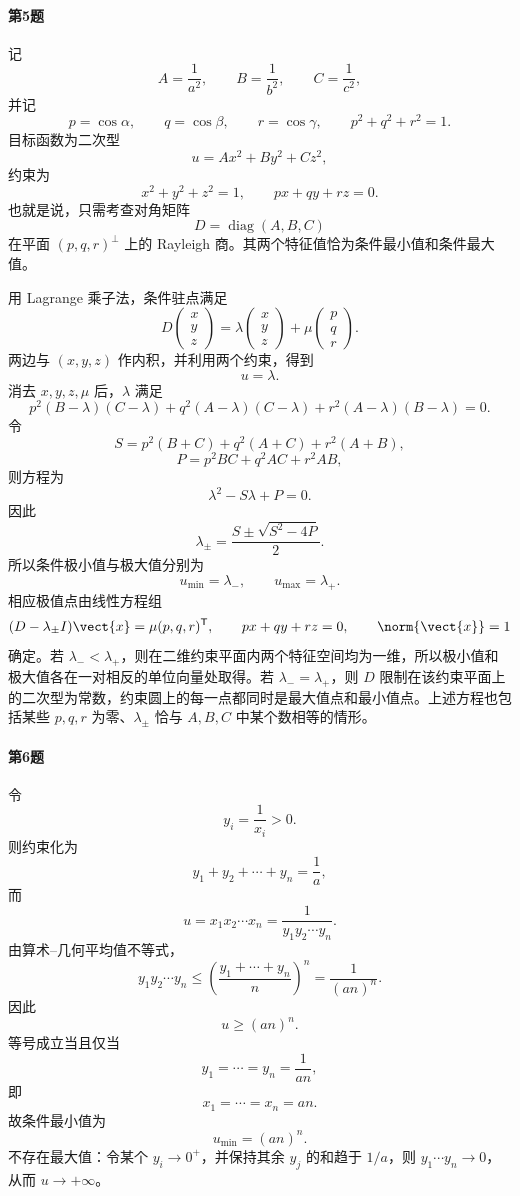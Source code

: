 \paragraph{第5题}
\begin{xsolution}
记
\[
  A=\frac1{a^2},\qquad B=\frac1{b^2},\qquad C=\frac1{c^2},
\]
并记
\[
  p=\cos\alpha,\qquad q=\cos\beta,\qquad r=\cos\gamma,
  \qquad p^2+q^2+r^2=1.
\]
目标函数为二次型
\[
  u=Ax^2+By^2+Cz^2,
\]
约束为
\[
  x^2+y^2+z^2=1,
  \qquad
  px+qy+rz=0.
\]
也就是说，只需考查对角矩阵
\[
  D=\operatorname{diag}(A,B,C)
\]
在平面 $(p,q,r)^\perp$ 上的 Rayleigh 商。其两个特征值恰为条件最小值和条件最大值。

用 Lagrange 乘子法，条件驻点满足
\[
  D\begin{pmatrix}x\\y\\z\end{pmatrix}
  =\lambda\begin{pmatrix}x\\y\\z\end{pmatrix}
  +\mu\begin{pmatrix}p\\q\\r\end{pmatrix}.
\]
两边与 $(x,y,z)$ 作内积，并利用两个约束，得到
\[
  u=\lambda.
\]
消去 $x,y,z,\mu$ 后，$\lambda$ 满足
\[
  p^2(B-\lambda)(C-\lambda)
  +q^2(A-\lambda)(C-\lambda)
  +r^2(A-\lambda)(B-\lambda)=0.
\]
令
\[
  S=p^2(B+C)+q^2(A+C)+r^2(A+B),
\]
\[
  P=p^2BC+q^2AC+r^2AB,
\]
则方程为
\[
  \lambda^2-S\lambda+P=0.
\]
因此
\[
  \lambda_\pm
  =\frac{S\pm\sqrt{S^2-4P}}2.
\]
所以条件极小值与极大值分别为
\[
  u_{\min}=\lambda_-,
  \qquad
  u_{\max}=\lambda_+.
\]
相应极值点由线性方程组
\[
  (D-\lambda_\pm I)\vect{x}=\mu(p,q,r)^{\mathsf T},
  \qquad
  p x+q y+r z=0,
  \qquad
  \norm{\vect{x}}=1
\]
确定。若 $\lambda_-<\lambda_+$，则在二维约束平面内两个特征空间均为一维，所以极小值和极大值各在一对相反的单位向量处取得。若 $\lambda_-=\lambda_+$，则 $D$ 限制在该约束平面上的二次型为常数，约束圆上的每一点都同时是最大值点和最小值点。上述方程也包括某些 $p,q,r$ 为零、$\lambda_\pm$ 恰与 $A,B,C$ 中某个数相等的情形。
\end{xsolution}

\paragraph{第6题}
\begin{xsolution}
令
\[
  y_i=\frac1{x_i}>0.
\]
则约束化为
\[
  y_1+y_2+\cdots+y_n=\frac1a,
\]
而
\[
  u=x_1x_2\cdots x_n=\frac1{y_1y_2\cdots y_n}.
\]
由算术--几何平均值不等式，
\[
  y_1y_2\cdots y_n
  \le\left(\frac{y_1+\cdots+y_n}{n}\right)^n
  =\frac1{(an)^n}.
\]
因此
\[
  u\ge(an)^n.
\]
等号成立当且仅当
\[
  y_1=\cdots=y_n=\frac1{an},
\]
即
\[
  x_1=\cdots=x_n=an.
\]
故条件最小值为
\[
  u_{\min}=(an)^n.
\]
不存在最大值：令某个 $y_i\to0^+$，并保持其余 $y_j$ 的和趋于 $1/a$，则 $y_1\cdots y_n\to0$，从而 $u\to+\infty$。
\end{xsolution}

